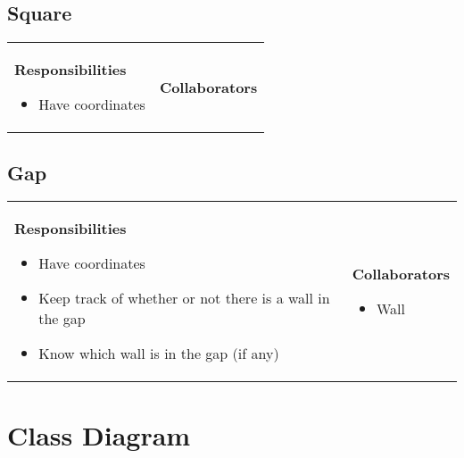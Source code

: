 \documentclass[a4paper]{article}
\begin{document}
\subsection*{Square}
\begin{tabular}{p{9cm}p{3cm}}
    \textbf{Responsibilities}
    \begin{itemize}
    \item Have coordinates
    \end{itemize}
    &
    \textbf{Collaborators}
\end{tabular}

\subsection*{Gap}
\begin{tabular}{p{9cm}p{3cm}}
    \textbf{Responsibilities}
    \begin{itemize}
    \item Have coordinates
    \item Keep track of whether or not there is a wall in the gap
    \item Know which wall is in the gap (if any)
    \end{itemize}
    &
    \textbf{Collaborators}

    \begin{itemize}
    \item Wall
    \end{itemize}
\end{tabular}

\pagebreak

\section{Class Diagram}

\begin{tabular}{p{12cm}}

\end{tabular}
\end{document}

